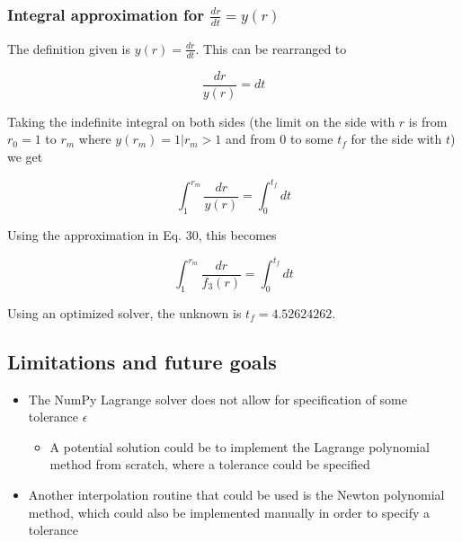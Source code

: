 \subsubsection{Integral approximation for \texorpdfstring{$\frac{dr}{dt}=y(r)$}{}}

The definition given is $y(r)=\frac{dr}{dt}$. This can be rearranged to

\begin{equation}
    \frac{dr}{y(r)}=dt
\end{equation}

Taking the indefinite integral on both sides (the limit on the side with $r$ is from $r_0=1$ to $r_m$ where $y(r_m)=1|r_m > 1$ and from $0$ to some $t_f$ for the side with $t$) we get

\begin{equation}
    \int_{1}^{r_m}\frac{dr}{y(r)}=\int_0^{t_f}dt
\end{equation}

Using the approximation in Eq. 30, this becomes

\begin{equation}
    \int_{1}^{r_m}\frac{dr}{f_3(r)}=\int_0^{t_f}dt
\end{equation}

Using an optimized solver, the unknown is $t_f=4.52624262$.

\subsection{Limitations and future goals}

\begin{itemize}
    \item The NumPy Lagrange solver does not allow for specification of some tolerance $\epsilon$
    \begin{itemize}
        \item A potential solution could be to implement the Lagrange polynomial method from scratch, where a tolerance could be specified
    \end{itemize}
    \item Another interpolation routine that could be used is the Newton polynomial method, which could also be implemented manually in order to specify a tolerance
\end{itemize}